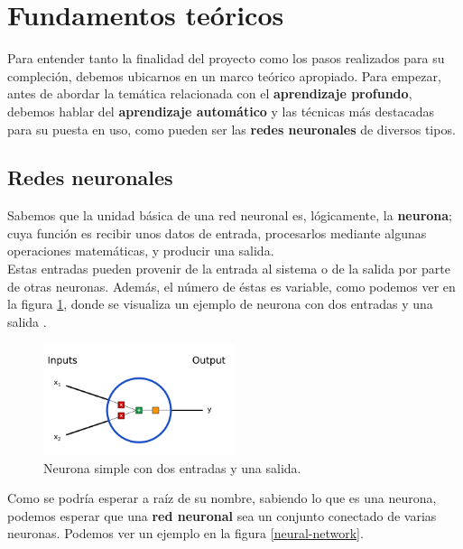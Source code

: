 \documentclass[]{scrartcl}
\begin{document}
\section{Fundamentos teóricos}

	Para entender tanto la finalidad del proyecto como los pasos realizados para su compleción, debemos ubicarnos en un marco teórico apropiado. Para empezar, antes de abordar la temática relacionada con el \textbf{aprendizaje profundo}, debemos hablar del \textbf{aprendizaje automático} y las técnicas más destacadas para su puesta en uso, como pueden ser las \textbf{redes neuronales} de diversos tipos.
	
	\subsection{Redes neuronales}
	
		Sabemos que la unidad básica de una red neuronal es, lógicamente, la \textbf{neurona}; cuya función es recibir unos datos de entrada, procesarlos mediante algunas operaciones matemáticas, y producir una salida.\\
		
		Estas entradas pueden provenir de la entrada al sistema o de la salida por parte de otras neuronas. Además, el número de éstas es variable, como podemos ver en la figura \ref{neuron}, donde se visualiza un ejemplo de neurona con dos entradas y una salida \cite{introduction-neural-networks}.\\
	
		\begin{figure}[h]
			\centering
			\includegraphics[width=0.5\textwidth]{./img/neuron}
			\caption{Neurona simple con dos entradas y una salida.}
			\label{neuron}
		\end{figure}
	
		Como se podría esperar a raíz de su nombre, sabiendo lo que es una neurona, podemos esperar que una \textbf{red neuronal} sea un conjunto conectado de varias neuronas. Podemos ver un ejemplo en la figura \ref{neural-network}.\\
		
\end{document}
